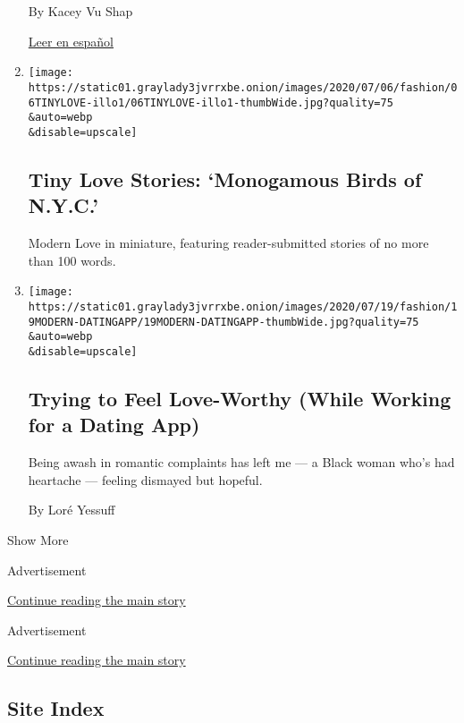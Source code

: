 \begin{enumerate}
  By Kacey Vu Shap

  \href{https://www.nytimes3xbfgragh.onion/es/2020/08/02/espanol/estilos-de-vida/adopcion-orfanato.html}{Leer
  en español}
\item
  \href{/2020/07/21/style/tiny-modern-love-stories-coronavirus-monogamous-birds-of-nyc.html}{}

  \texttt{[image: https://static01.graylady3jvrrxbe.onion/images/2020/07/06/fashion/06TINYLOVE-illo1/06TINYLOVE-illo1-thumbWide.jpg?quality=75\\\&auto=webp\\\&disable=upscale]}

  \hypertarget{tiny-love-stories-monogamous-birds-of-nyc}{%
  \subsection{Tiny Love Stories: `Monogamous Birds of
  N.Y.C.'}\label{tiny-love-stories-monogamous-birds-of-nyc}}

  Modern Love in miniature, featuring reader-submitted stories of no
  more than 100 words.
\item
  \href{/2020/07/17/style/modern-love-feel-love-worthy-working-for-dating-app.html}{}

  \texttt{[image: https://static01.graylady3jvrrxbe.onion/images/2020/07/19/fashion/19MODERN-DATINGAPP/19MODERN-DATINGAPP-thumbWide.jpg?quality=75\\\&auto=webp\\\&disable=upscale]}

  \hypertarget{trying-to-feel-love-worthy-while-working-for-a-dating-app}{%
  \subsection{Trying to Feel Love-Worthy (While Working for a Dating
  App)}\label{trying-to-feel-love-worthy-while-working-for-a-dating-app}}

  Being awash in romantic complaints has left me --- a Black woman who's
  had heartache --- feeling dismayed but hopeful.

  By Loré Yessuff
\end{enumerate}

Show More

Advertisement

\protect\hyperlink{after-mid2}{Continue reading the main story}

Advertisement

\protect\hyperlink{after-mktg}{Continue reading the main story}

\hypertarget{site-index}{%
\subsection{Site Index}\label{site-index}}

